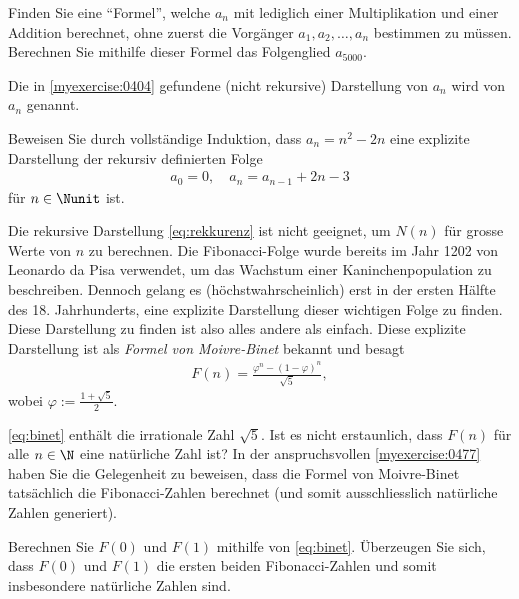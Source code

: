 \begin{myexercise}\label{myexercise:0404}
	Finden Sie eine \enquote{Formel}, welche $a_n$ mit lediglich einer Multiplikation und einer Addition berechnet, ohne zuerst die Vorgänger $a_{1}, a_{2}, \ldots, a_{n}$ bestimmen zu müssen. Berechnen Sie mithilfe dieser Formel das Folgenglied $a_{5000}$.
\end{myexercise}
\noindent
Die in \cref{myexercise:0404} gefundene (nicht rekursive) Darstellung von $a_n$ wird  von $a_n$ genannt.

\begin{myexercise}\label{myexercise:0405}
	Beweisen Sie durch vollständige Induktion, dass $a_n = n^2 -2n$ eine explizite Darstellung der rekursiv definierten Folge
	\begin{align*}
		a_0 = 0, \quad a_{n} = a_{n-1} + 2n - 3
	\end{align*}
	für $n\in\Nunit$ ist.
\end{myexercise}
\noindent
Die rekursive Darstellung \cref{eq:rekkurenz} ist nicht geeignet, um $N(n)$ für grosse Werte von $n$ zu berechnen. Die Fibonacci-Folge wurde bereits im  Jahr 1202 von Leonardo da Pisa verwendet, um das Wachstum einer Kaninchenpopulation zu beschreiben. Dennoch gelang es (höchstwahrscheinlich) erst in der ersten Hälfte des 18. Jahrhunderts, eine explizite Darstellung dieser wichtigen Folge zu finden. Diese Darstellung zu finden ist also alles andere als einfach. Diese explizite Darstellung ist als \textit{Formel von Moivre-Binet} bekannt und besagt
\begin{align}\label{eq:binet}
	F(n) = \frac{\varphi^n - (1-\varphi)^n}{\sqrt{5}},
\end{align}
wobei $\varphi := \frac{1+\sqrt{5}}{2}$.

\cref{eq:binet} enthält die irrationale Zahl $\sqrt{5}$. Ist es nicht erstaunlich, dass $F(n)$ für alle $n\in\N$ eine natürliche Zahl ist? In der anspruchsvollen \cref{myexercise:0477} haben Sie die Gelegenheit zu beweisen, dass die Formel von Moivre-Binet tatsächlich die Fibonacci-Zahlen berechnet (und somit ausschliesslich natürliche Zahlen generiert).

\begin{myexercise}\label{myexercise:0478}
	Berechnen Sie $F(0)$ und $F(1)$ mithilfe von \cref{eq:binet}. Überzeugen Sie sich, dass $F(0)$ und $F(1)$ die ersten beiden Fibonacci-Zahlen und somit insbesondere natürliche Zahlen sind.
\end{myexercise}

